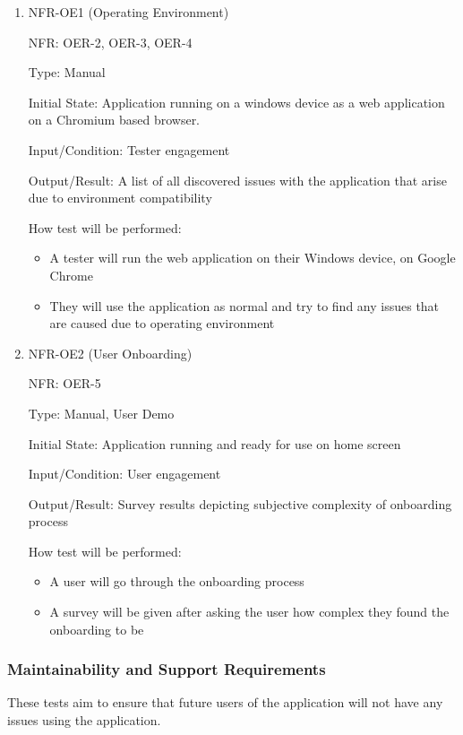 \documentclass[12pt, titlepage]{article}
\begin{document}
\begin{enumerate}

\item{NFR-OE1 (Operating Environment)\\}

NFR: OER-2, OER-3, OER-4

Type: Manual

Initial State: Application running on a windows device as a web application on a
Chromium based browser.

Input/Condition: Tester engagement

Output/Result: A list of all discovered issues with the application that arise
due to environment compatibility

How test will be performed: 
\begin{itemize}
  \item A tester will run the web application on their Windows device, on Google
  Chrome
  \item They will use the application as normal and try to find any issues that
  are caused due to operating environment
\end{itemize}
					
\item{NFR-OE2 (User Onboarding)\\}

NFR: OER-5

Type: Manual, User Demo

Initial State: Application running and ready for use on home screen

Input/Condition: User engagement

Output/Result: Survey results depicting subjective complexity of onboarding
process

How test will be performed: 
\begin{itemize}
  \item A user will go through the onboarding process
  \item A survey will be given after asking the user how complex they found the
  onboarding to be
\end{itemize}
\end{enumerate}

\subsubsection{Maintainability and Support Requirements}
These tests aim to ensure that future users of the application will not have any
issues using the application. 
\end{document}
